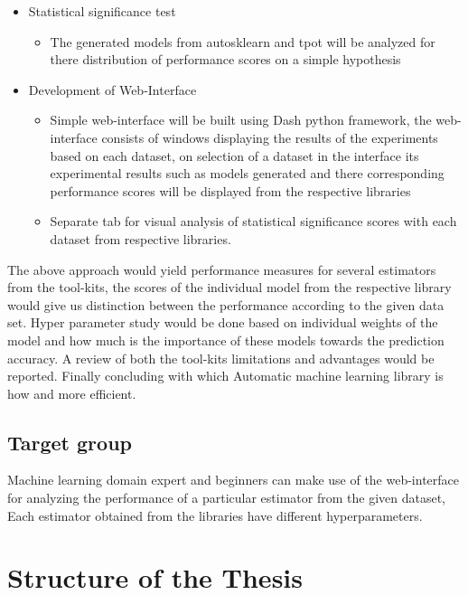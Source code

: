 \begin{itemize}
    \item Statistical significance test
    \begin{itemize}
        \item The generated models from autosklearn and tpot will be analyzed for there distribution of performance scores on a simple hypothesis
    \end{itemize}
    
    \item Development of Web-Interface
    \begin{itemize}
        \item Simple web-interface will be built using Dash python framework, the web-interface consists of windows displaying the results of the experiments based on each dataset, on selection of a dataset in the interface its experimental results such as models generated and there corresponding performance scores will be displayed from the respective libraries
        \item Separate tab for visual analysis of statistical significance scores with each dataset from respective libraries.
    \end{itemize}
    
\end{itemize}

The above approach would yield  performance measures for several estimators from the tool-kits, the scores of the individual model from the respective library would give us distinction between the performance according to the given data set. Hyper parameter study would be done based on individual weights of the model and how much is the importance of these models towards the prediction accuracy. A review of both the tool-kits limitations and advantages would be reported. Finally concluding with which Automatic machine learning library is how and more efficient.

\subsection{Target group}

Machine learning domain expert and beginners can make use of the web-interface for analyzing the performance of a particular estimator from the given dataset, Each estimator obtained from the libraries have different hyperparameters.


\section{Structure of the Thesis}



